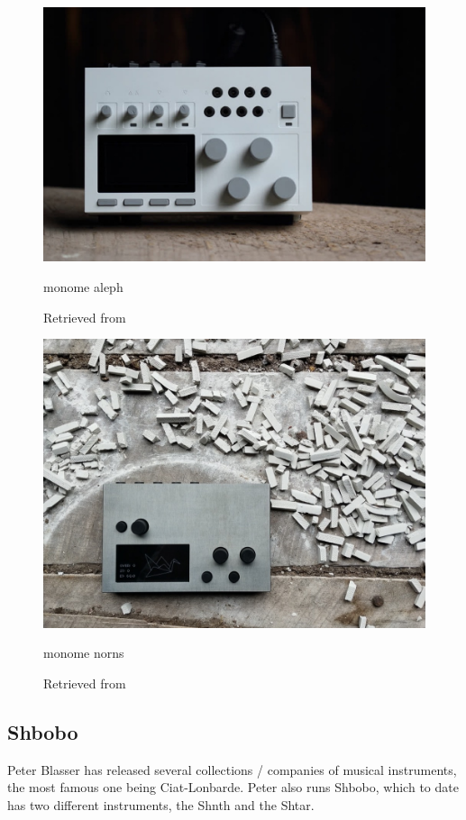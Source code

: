 \begin{figure}[ht]
  \centering
  \includegraphics[width=0.75\linewidth,height=0.25\textheight,keepaspectratio]{images/monome-aleph.jpg}
  \caption{monome aleph}
  \caption*{Retrieved from \cite{website-monome-current}}
  \label{fig:monome-aleph}
\end{figure}

\begin{figure}[ht]
  \centering
  \includegraphics[width=0.75\linewidth,height=0.25\textheight,keepaspectratio]{images/monome-norns.jpg}
  \caption{monome norns}
  \caption*{Retrieved from \cite{website-monome-current}}
  \label{fig:monome-norns}
\end{figure}

\subsection{Shbobo}

Peter Blasser has released several collections / companies of musical instruments, the most famous one being Ciat-Lonbarde. Peter also runs Shbobo, which to date has two different instruments, the Shnth and the Shtar.

